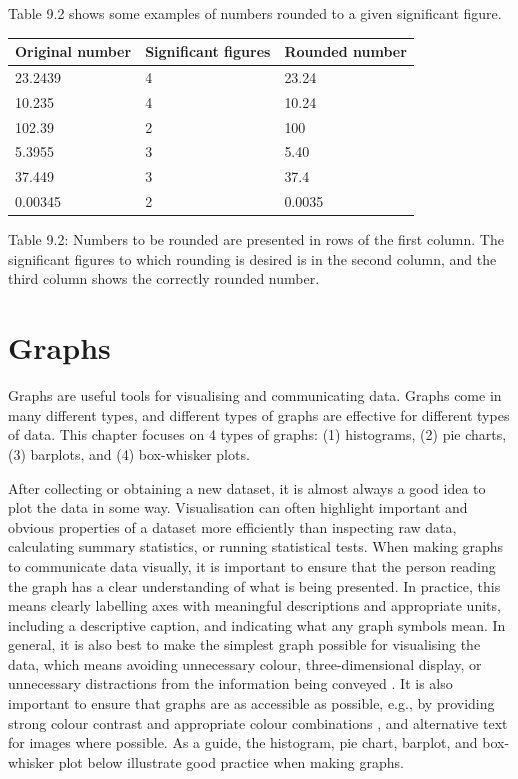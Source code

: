 \documentclass[
]{scrbook}
\begin{document}
Table 9.2 shows some examples of numbers rounded to a given significant figure.

\begin{longtable}[]{@{}lll@{}}
\toprule
Original number & Significant figures & Rounded number \\
\midrule
\endhead
23.2439 & 4 & 23.24 \\
10.235 & 4 & 10.24 \\
102.39 & 2 & 100 \\
5.3955 & 3 & 5.40 \\
37.449 & 3 & 37.4 \\
0.00345 & 2 & 0.0035 \\
\bottomrule
\end{longtable}

Table 9.2: Numbers to be rounded are presented in rows of the first column. The significant figures to which rounding is desired is in the second column, and the third column shows the correctly rounded number.

\hypertarget{Chapter_10}{%
\chapter{Graphs}\label{Chapter_10}}

Graphs are useful tools for visualising and communicating data.
Graphs come in many different types, and different types of graphs are effective for different types of data.
This chapter focuses on 4 types of graphs: (1) histograms, (2) pie charts, (3) barplots, and (4) box-whisker plots.

After collecting or obtaining a new dataset, it is almost always a good idea to plot the data in some way.
Visualisation can often highlight important and obvious properties of a dataset more efficiently than inspecting raw data, calculating summary statistics, or running statistical tests.
When making graphs to communicate data visually, it is important to ensure that the person reading the graph has a clear understanding of what is being presented.
In practice, this means clearly labelling axes with meaningful descriptions and appropriate units, including a descriptive caption, and indicating what any graph symbols mean.
In general, it is also best to make the simplest graph possible for visualising the data, which means avoiding unnecessary colour, three-dimensional display, or unnecessary distractions from the information being conveyed \citep{Dytham2011, Kelleher2011}.
It is also important to ensure that graphs are as accessible as possible, e.g., by providing strong colour contrast and appropriate colour combinations \citep{Elavsky2022}, and alternative text for images where possible.
As a guide, the histogram, pie chart, barplot, and box-whisker plot below illustrate good practice when making graphs.
\end{document}
